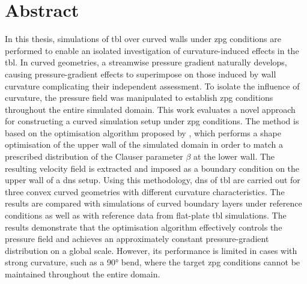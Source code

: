 \chapter*{Abstract}

In this thesis, simulations of \acrfull{tbl} over curved walls under \acrfull{zpg} conditions are performed to enable an isolated investigation of curvature-induced effects in the \acrshort{tbl}.  
In curved geometries, a streamwise pressure gradient naturally develops, causing pressure-gradient effects to superimpose on those induced by wall curvature complicating their independent assessment. To isolate the influence of curvature, the pressure field was manipulated to establish \acrshort{zpg} conditions throughout 
 the entire simulated domain.
This work evaluates a novel approach for constructing a curved simulation setup under \acrshort{zpg} conditions.
The method is based on the optimisation algorithm proposed by \citet{morita_applying_2022}, which performs a shape optimisation  of the upper wall of the simulated domain in order to match a prescribed distribution of the Clauser parameter $\beta$ at the lower wall.
The resulting velocity field is extracted and imposed as a  boundary condition on the upper wall of a \acrlong{dns} setup.
Using this methodology, \acrlong{dns} of \acrlong{tbl} are carried out for three convex curved geometries with different curvature characteristics.
The results are compared with simulations of curved boundary layers under reference conditions as well as with reference data from flat-plate \acrlong{tbl} simulations.
The results demonstrate that the optimisation algorithm effectively controls  the pressure field and achieves an approximately constant pressure-gradient distribution on a global scale. 
However, its performance is limited in cases with strong curvature, such as a 90° bend, where the target \acrshort{zpg} conditions cannot be maintained throughout the entire domain.

